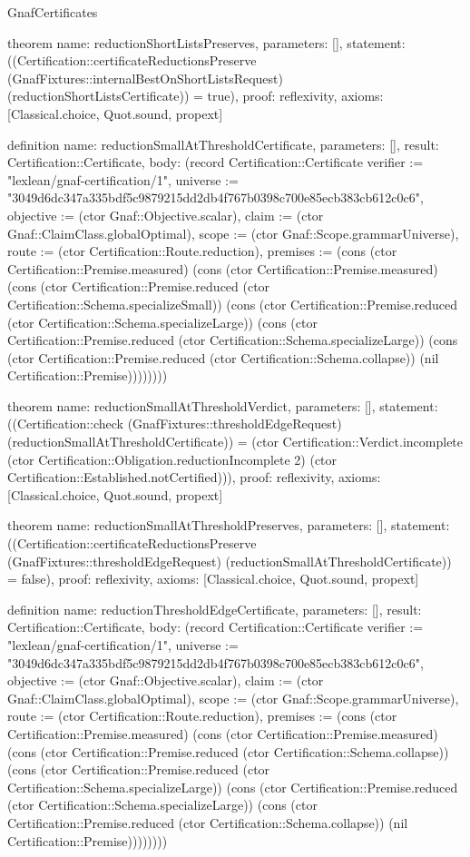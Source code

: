 \begin{lexlean}{GnafCertificates}
\begin{semanticmodule}
theorem{
  name: reductionShortListsPreserves,
  parameters: [],
  statement: ((Certification::certificateReductionsPreserve (GnafFixtures::internalBestOnShortListsRequest) (reductionShortListsCertificate)) = true),
  proof: reflexivity{},
  axioms: [Classical.choice, Quot.sound, propext]
}

definition{
  name: reductionSmallAtThresholdCertificate,
  parameters: [],
  result: Certification::Certificate,
  body: (record Certification::Certificate {verifier := "lexlean/gnaf-certification/1", universe := "3049d6dc347a335bdf5c9879215dd2db4f767b0398c700e85ecb383cb612c0c6", objective := (ctor Gnaf::Objective.scalar), claim := (ctor Gnaf::ClaimClass.globalOptimal), scope := (ctor Gnaf::Scope.grammarUniverse), route := (ctor Certification::Route.reduction), premises := (cons (ctor Certification::Premise.measured) (cons (ctor Certification::Premise.measured) (cons (ctor Certification::Premise.reduced (ctor Certification::Schema.specializeSmall)) (cons (ctor Certification::Premise.reduced (ctor Certification::Schema.specializeLarge)) (cons (ctor Certification::Premise.reduced (ctor Certification::Schema.specializeLarge)) (cons (ctor Certification::Premise.reduced (ctor Certification::Schema.collapse)) (nil Certification::Premise)))))))})
}

theorem{
  name: reductionSmallAtThresholdVerdict,
  parameters: [],
  statement: ((Certification::check (GnafFixtures::thresholdEdgeRequest) (reductionSmallAtThresholdCertificate)) = (ctor Certification::Verdict.incomplete (ctor Certification::Obligation.reductionIncomplete 2) (ctor Certification::Established.notCertified))),
  proof: reflexivity{},
  axioms: [Classical.choice, Quot.sound, propext]
}

theorem{
  name: reductionSmallAtThresholdPreserves,
  parameters: [],
  statement: ((Certification::certificateReductionsPreserve (GnafFixtures::thresholdEdgeRequest) (reductionSmallAtThresholdCertificate)) = false),
  proof: reflexivity{},
  axioms: [Classical.choice, Quot.sound, propext]
}

definition{
  name: reductionThresholdEdgeCertificate,
  parameters: [],
  result: Certification::Certificate,
  body: (record Certification::Certificate {verifier := "lexlean/gnaf-certification/1", universe := "3049d6dc347a335bdf5c9879215dd2db4f767b0398c700e85ecb383cb612c0c6", objective := (ctor Gnaf::Objective.scalar), claim := (ctor Gnaf::ClaimClass.globalOptimal), scope := (ctor Gnaf::Scope.grammarUniverse), route := (ctor Certification::Route.reduction), premises := (cons (ctor Certification::Premise.measured) (cons (ctor Certification::Premise.measured) (cons (ctor Certification::Premise.reduced (ctor Certification::Schema.collapse)) (cons (ctor Certification::Premise.reduced (ctor Certification::Schema.specializeLarge)) (cons (ctor Certification::Premise.reduced (ctor Certification::Schema.specializeLarge)) (cons (ctor Certification::Premise.reduced (ctor Certification::Schema.collapse)) (nil Certification::Premise)))))))})
}


\end{semanticmodule}
\end{lexlean}
